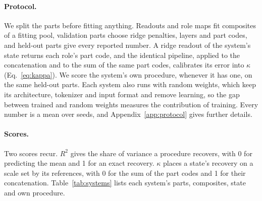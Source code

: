 \documentclass[10pt]{article}
\theoremstyle{plain}
\theoremstyle{remark}
\begin{document}
\paragraph{Protocol.} We split the parts before fitting anything. Readouts and role maps fit composites of a fitting pool, validation parts choose ridge penalties, layers and part codes, and held-out parts give every reported number. A ridge readout of the system's state returns each role's part code, and the identical pipeline, applied to the concatenation and to the sum of the same part codes, calibrates its error into $\kappa$ (Eq.~\ref{eq:kappa}). We score the system's own procedure, whenever it has one, on the same held-out parts. Each system also runs with random weights, which keep its architecture, tokenizer and input format and remove learning, so the gap between trained and random weights measures the contribution of training. Every number is a mean over seeds, and Appendix~\ref{app:protocol} gives further details.

\paragraph{Scores.} Two scores recur. $R^2$ gives the share of variance a procedure recovers, with 0 for predicting the mean and 1 for an exact recovery. $\kappa$ places a state's recovery on a scale set by its references, with 0 for the sum of the part codes and 1 for their concatenation. Table~\ref{tab:systems} lists each system's parts, composites, state and own procedure.
\end{document}
